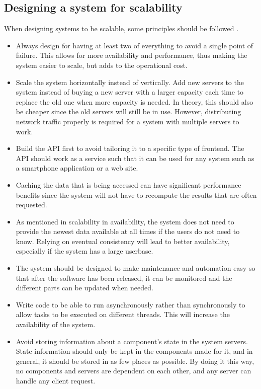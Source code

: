 \subsection{Designing a system for scalability}
When designing systems to be scalable, some principles should be followed \cite{ScalabilityDesignPrinciples}.
\begin{itemize}
    \item Always design for having at least two of everything to avoid a single point of failure. 
    This allows for more availability and performance, thus making the system easier to scale, but adds to the operational cost.
    \item Scale the system horizontally instead of vertically.
    Add new servers to the system instead of buying a new server with a larger capacity each time to replace the old one when more capacity is needed. 
    In theory, this should also be cheaper since the old servers will still be in use. 
    However, distributing network traffic properly is required for a system with multiple servers to work.
    \item Build the API first to avoid tailoring it to a specific type of frontend. 
    The API should work as a service such that it can be used for any system such as a smartphone application or a web site. 
    \item Caching the data that is being accessed can have significant performance benefits since the system will not have to recompute the results that are often requested. 
    \item As mentioned in scalability in availability, the system does not need to provide the newest data available at all times if the users do not need to know. 
    Relying on eventual consistency will lead to better availability, especially if the system has a large userbase.
    \item The system should be designed to make maintenance and automation easy so that after the software has been released, it can be monitored and the different parts can be updated when needed.
    \item Write code to be able to run asynchronously rather than synchronously to allow tasks to be executed on different threads.
    This will increase the availability of the system.
    \item Avoid storing information about a component's state in the system servers. 
    State information should only be kept in the components made for it, and in general, it should be stored in as few places as possible. 
    By doing it this way, no components and servers are dependent on each other, and any server can handle any client request. 
\end{itemize}
